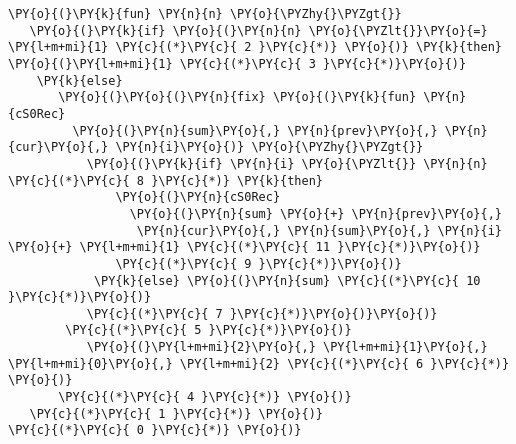 \begin{Verbatim}[commandchars=\\\{\},codes={\catcode`\$=3\catcode`\^=7\catcode`\_=8}]
\PY{o}{(}\PY{k}{fun} \PY{n}{n} \PY{o}{\PYZhy{}\PYZgt{}}
   \PY{o}{(}\PY{k}{if} \PY{o}{(}\PY{n}{n} \PY{o}{\PYZlt{}}\PY{o}{=} \PY{l+m+mi}{1} \PY{c}{(*}\PY{c}{ 2 }\PY{c}{*)} \PY{o}{)} \PY{k}{then} \PY{o}{(}\PY{l+m+mi}{1} \PY{c}{(*}\PY{c}{ 3 }\PY{c}{*)}\PY{o}{)}
    \PY{k}{else}
       \PY{o}{(}\PY{o}{(}\PY{n}{fix} \PY{o}{(}\PY{k}{fun} \PY{n}{cS0Rec}
         \PY{o}{(}\PY{n}{sum}\PY{o}{,} \PY{n}{prev}\PY{o}{,} \PY{n}{cur}\PY{o}{,} \PY{n}{i}\PY{o}{)} \PY{o}{\PYZhy{}\PYZgt{}}
           \PY{o}{(}\PY{k}{if} \PY{n}{i} \PY{o}{\PYZlt{}} \PY{n}{n} \PY{c}{(*}\PY{c}{ 8 }\PY{c}{*)} \PY{k}{then}
               \PY{o}{(}\PY{n}{cS0Rec}
                 \PY{o}{(}\PY{n}{sum} \PY{o}{+} \PY{n}{prev}\PY{o}{,}
                  \PY{n}{cur}\PY{o}{,} \PY{n}{sum}\PY{o}{,} \PY{n}{i} \PY{o}{+} \PY{l+m+mi}{1} \PY{c}{(*}\PY{c}{ 11 }\PY{c}{*)}\PY{o}{)}
               \PY{c}{(*}\PY{c}{ 9 }\PY{c}{*)}\PY{o}{)}
            \PY{k}{else} \PY{o}{(}\PY{n}{sum} \PY{c}{(*}\PY{c}{ 10 }\PY{c}{*)}\PY{o}{)}
           \PY{c}{(*}\PY{c}{ 7 }\PY{c}{*)}\PY{o}{)}\PY{o}{)}
        \PY{c}{(*}\PY{c}{ 5 }\PY{c}{*)}\PY{o}{)}
           \PY{o}{(}\PY{l+m+mi}{2}\PY{o}{,} \PY{l+m+mi}{1}\PY{o}{,} \PY{l+m+mi}{0}\PY{o}{,} \PY{l+m+mi}{2} \PY{c}{(*}\PY{c}{ 6 }\PY{c}{*)} \PY{o}{)}
       \PY{c}{(*}\PY{c}{ 4 }\PY{c}{*)} \PY{o}{)}
   \PY{c}{(*}\PY{c}{ 1 }\PY{c}{*)} \PY{o}{)}
\PY{c}{(*}\PY{c}{ 0 }\PY{c}{*)} \PY{o}{)}
\end{Verbatim}
